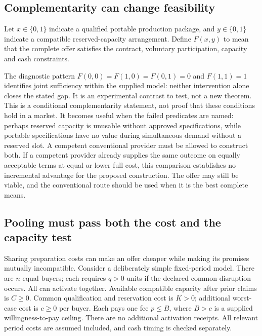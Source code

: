 \documentclass[11pt,a4paper]{article}
\begin{document}
\subsection{Complementarity can change feasibility}
Let $x\in\{0,1\}$ indicate a qualified portable production package, and $y\in\{0,1\}$ indicate a compatible reserved-capacity arrangement. Define $F(x,y)$ to mean that the complete offer satisfies the contract, voluntary participation, capacity and cash constraints.

The diagnostic pattern $F(0,0)=F(1,0)=F(0,1)=0$ and $F(1,1)=1$ identifies joint sufficiency within the supplied model: neither intervention alone closes the stated gap. It is an experimental contrast to test, not a new theorem.
This is a conditional complementarity statement, not proof that these conditions hold in a market. It becomes useful when the failed predicates are named: perhaps reserved capacity is unusable without approved specifications, while portable specifications have no value during simultaneous demand without a reserved slot. A competent conventional provider must be allowed to construct both. If a competent provider already supplies the same outcome on equally acceptable terms at equal or lower full cost, this comparison establishes no incremental advantage for the proposed construction. The offer may still be viable, and the conventional route should be used when it is the best complete means.

\subsection{Pooling must pass both the cost and the capacity test}
Sharing preparation costs can make an offer cheaper while making its promises mutually incompatible. Consider a deliberately simple fixed-period model. There are $n$ equal buyers; each requires $q>0$ units if the declared common disruption occurs. All can activate together. Available compatible capacity after prior claims is $C\geq0$. Common qualification and reservation cost is $K>0$; additional worst-case cost is $c\geq0$ per buyer. Each pays one fee $p\leq B$, where $B>c$ is a supplied willingness-to-pay ceiling. There are no additional activation receipts. All relevant period costs are assumed included, and cash timing is checked separately.
\end{document}
